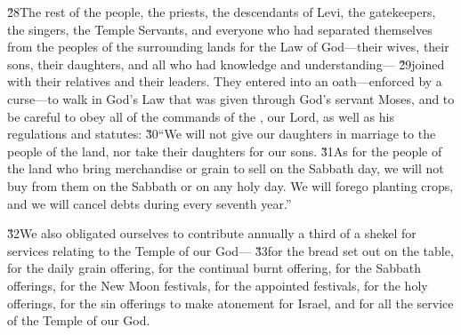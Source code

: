 \v{28}The rest of the people, the priests, the descendants of Levi, the gatekeepers, the singers, the Temple Servants, and everyone who had separated themselves from the peoples of the surrounding lands for the Law of God---their wives, their sons, their daughters, and all who had knowledge and understanding--- \v{29}joined with their relatives and their leaders. They entered into an oath---enforced by a curse---to walk in God's Law that was given through God's servant Moses, and to be careful to obey all of the commands of the , our Lord, as well as his regulations and statutes: \v{30}``We will not give our daughters in marriage to the people of the land, nor take their daughters for our sons. \v{31}As for the people of the land who bring merchandise or grain to sell on the Sabbath day, we will not buy from them on the Sabbath or on any holy day. We will forego planting crops, and we will cancel debts during every seventh year.''

\v{32}We also obligated ourselves to contribute annually a third of a shekel for services relating to the Temple of our God--- \v{33}for the bread set out on the table, for the daily grain offering, for the continual burnt offering, for the Sabbath offerings, for the New Moon festivals, for the appointed festivals, for the holy offerings, for the sin offerings to make atonement for Israel, and for all the service of the Temple of our God.

